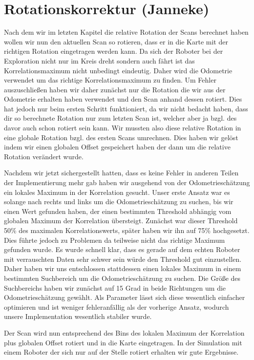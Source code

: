 \section{Rotationskorrektur (Janneke)}

Nach dem wir im letzten Kapitel die relative Rotation der Scans berechnet haben wollen wir nun den aktuellen Scan so rotieren, dass er in die Karte mit der richtigen Rotation eingetragen werden kann. Da sich der Roboter bei der Exploration nicht nur im Kreis dreht sondern auch fährt ist das Korrelationsmaximum nicht unbedingt eindeutig. Daher wird die Odometrie verwendet um das richtige Korrelationsmaximum zu finden. Um Fehler auszuschließen haben wir daher zunächst nur die Rotation die wir aus der Odometrie erhalten haben verwendet und den Scan anhand dessen rotiert. Dies hat jedoch nur beim ersten Schritt funktioniert, da wir nicht bedacht haben, dass dir so berechnete Rotation nur zum letzten Scan ist, welcher aber ja bzgl. des davor auch schon rotiert sein kann. Wir mussten also diese relative Rotation in eine globale Rotation bzgl. des ersten Scans umrechnen. Dies haben wir gelöst indem wir einen globalen Offset gespeichert haben der dann um die relative Rotation verändert wurde.

Nachdem wir jetzt sichergestellt hatten, dass es keine Fehler in anderen Teilen der Implementierung mehr gab haben wir ausgehend von der Odometrieschätzung ein lokales Maximum in der Korrelation gesucht. Unser erste Ansatz war es solange nach rechts und links um die Odometrieschätzung zu suchen, bis wir einen Wert gefunden haben, der einen bestimmten Threshold abhängig vom globalen Maximum der Korrelation übersteigt. Zunächst war dieser Threshold 50\% des maximalen Korrelationswerts, später haben wir ihn auf 75\% hochgesetzt. Dies führte jedoch zu Problemen da teilweise nicht das richtige Maximum gefunden wurde. Es wurde schnell klar, dass es gerade auf dem echten Roboter mit verrauschten Daten sehr schwer sein würde den Threshold gut einzustellen. Daher haben wir uns entschlossen stattdessen einen lokales Maximum in einem bestimmten Suchbereich um die Odometrieschätzung zu suchen. Die Größe des Suchbereichs haben wir zunächst auf 15 Grad in beide Richtungen um die Odometrieschätzung gewählt. Als Parameter lässt sich diese wesentlich einfacher optimieren und ist weniger fehleranfällig als der vorherige Ansatz, wodurch unsere Implementation wesentlich stabiler wurde.

Der Scan wird nun entsprechend des Bins des lokalen Maximum der Korrelation plus globalen Offset rotiert und in die Karte eingetragen. In der Simulation mit einem Roboter der sich nur auf der Stelle rotiert erhalten wir gute Ergebnisse.

